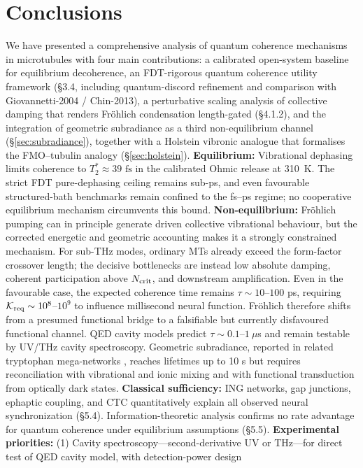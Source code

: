 \documentclass[twocolumn,10pt]{article}
\newcommand{\fs}{\text{~fs}}
\begin{document}
\section{Conclusions}
We have presented a comprehensive analysis of quantum coherence mechanisms
in microtubules with four main contributions: a calibrated open-system
baseline for equilibrium decoherence, an
FDT-rigorous quantum coherence utility framework (\S 3.4, including
quantum-discord refinement and comparison with Giovannetti-2004 /
Chin-2013), a perturbative scaling analysis of collective damping that
renders Fr\"ohlich condensation length-gated (\S 4.1.2), and the
integration of geometric subradiance as a third non-equilibrium channel
(\S\ref{sec:subradiance}), together with a Holstein vibronic analogue that
formalises the FMO--tubulin analogy (\S\ref{sec:holstein}).
\textbf{Equilibrium:} Vibrational dephasing limits coherence to
$T_2^* \approx 39\fs$ in the calibrated Ohmic release at 310~K. The strict FDT pure-dephasing ceiling remains sub-ps, and even favourable
structured-bath benchmarks remain confined to the fs--ps regime; no
cooperative equilibrium mechanism circumvents this bound.
\textbf{Non-equilibrium:} Fr\"ohlich pumping can in principle generate
driven collective vibrational behaviour, but the corrected energetic and
geometric accounting makes it a strongly constrained mechanism. For
sub-THz modes, ordinary MTs already exceed the form-factor crossover length;
the decisive bottlenecks are instead low absolute damping, coherent
participation above $N_{\rm crit}$, and downstream amplification. Even in
the favourable case, the expected coherence time remains
$\tau\sim10$--$100$ ps, requiring $\mathcal{K}_{\rm req}\sim10^8$--$10^9$
to influence millisecond neural function. Fr\"ohlich therefore shifts from
a presumed functional bridge to a falsifiable but currently disfavoured
functional channel. QED cavity models predict $\tau\sim0.1$--$1~\mu$s and
remain testable by UV/THz cavity spectroscopy. Geometric subradiance,
reported in related tryptophan mega-networks \cite{Babcock2024}, reaches
lifetimes up to 10 s but requires reconciliation with vibrational and ionic
mixing and with functional transduction from optically dark states.
\textbf{Classical sufficiency:} ING networks, gap junctions, ephaptic
coupling, and CTC quantitatively explain all observed neural
synchronization (\S 5.4). Information-theoretic analysis confirms no rate
advantage for quantum coherence under equilibrium assumptions (\S 5.5).
\textbf{Experimental priorities:} (1) Cavity spectroscopy---second-derivative
UV or THz---for direct test of QED cavity model, with detection-power design
\end{document}
